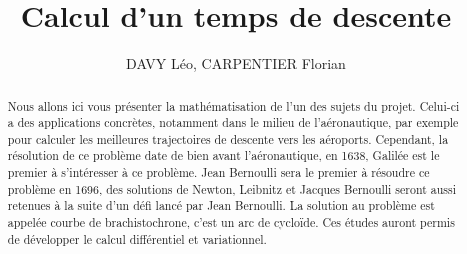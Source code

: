 \documentclass[a4paper,10pt]{article}
\title{Calcul d'un temps de descente}
\author{DAVY L\'eo, CARPENTIER Florian}
\begin{document}
\maketitle
\newtheorem{theorem}{Theor\`eme}
\begin{abstract}
Nous allons ici vous pr\'esenter la math\'ematisation de l'un des sujets du projet. Celui-ci a des applications concr\`etes, notamment dans le milieu de l'a\'eronautique, par exemple
pour calculer les meilleures trajectoires de descente vers les a\'eroports. Cependant, la r\'esolution de ce probl\`eme date de bien avant l'a\'eronautique, en 1638, Galil\'ee est le premier \`a s'int\'eresser
\`a ce probl\`eme. Jean Bernoulli sera le premier \`a r\'esoudre ce probl\`eme en 1696, des solutions de Newton, Leibnitz et Jacques Bernoulli seront aussi retenues \`a la suite d'un d\'efi lanc\'e
par Jean Bernoulli. La solution au probl\`eme est appel\'ee courbe de brachistochrone, c'est un arc de cycloïde. Ces \'etudes auront permis de d\'evelopper le calcul diff\'erentiel et variationnel.
\end{abstract}
\end{document}
